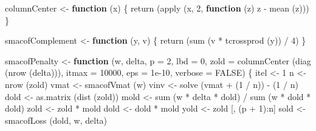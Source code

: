 \documentclass[
  12pt,
]{book}
\newenvironment{Shaded}{\begin{snugshade}}{\end{snugshade}}
\newcommand{\AttributeTok}[1]{\textcolor[rgb]{0.77,0.63,0.00}{#1}}
\newcommand{\ConstantTok}[1]{\textcolor[rgb]{0.00,0.00,0.00}{#1}}
\newcommand{\ControlFlowTok}[1]{\textcolor[rgb]{0.13,0.29,0.53}{\textbf{#1}}}
\newcommand{\DecValTok}[1]{\textcolor[rgb]{0.00,0.00,0.81}{#1}}
\newcommand{\FloatTok}[1]{\textcolor[rgb]{0.00,0.00,0.81}{#1}}
\newcommand{\FunctionTok}[1]{\textcolor[rgb]{0.00,0.00,0.00}{#1}}
\newcommand{\NormalTok}[1]{#1}
\newcommand{\OtherTok}[1]{\textcolor[rgb]{0.56,0.35,0.01}{#1}}
\newcommand{\SpecialCharTok}[1]{\textcolor[rgb]{0.00,0.00,0.00}{#1}}
\theoremstyle{definition}
\theoremstyle{definition}
\theoremstyle{definition}
\theoremstyle{definition}
\theoremstyle{remark}
\begin{document}
\begin{Shaded}
\begin{Highlighting}[]
\NormalTok{columnCenter }\OtherTok{\textless{}{-}} \ControlFlowTok{function}\NormalTok{ (x) \{}
  \FunctionTok{return}\NormalTok{ (}\FunctionTok{apply}\NormalTok{ (x, }\DecValTok{2}\NormalTok{, }\ControlFlowTok{function}\NormalTok{ (z)}
\NormalTok{    z }\SpecialCharTok{{-}} \FunctionTok{mean}\NormalTok{ (z)))}
\NormalTok{\}}

\NormalTok{smacofComplement }\OtherTok{\textless{}{-}} \ControlFlowTok{function}\NormalTok{ (y, v) \{}
  \FunctionTok{return}\NormalTok{ (}\FunctionTok{sum}\NormalTok{ (v }\SpecialCharTok{*} \FunctionTok{tcrossprod}\NormalTok{ (y)) }\SpecialCharTok{/} \DecValTok{4}\NormalTok{)}
\NormalTok{\}}

\NormalTok{smacofPenalty }\OtherTok{\textless{}{-}}
  \ControlFlowTok{function}\NormalTok{ (w,}
\NormalTok{            delta,}
            \AttributeTok{p =} \DecValTok{2}\NormalTok{,}
            \AttributeTok{lbd =} \DecValTok{0}\NormalTok{,}
            \AttributeTok{zold =} \FunctionTok{columnCenter}\NormalTok{ (}\FunctionTok{diag}\NormalTok{ (}\FunctionTok{nrow}\NormalTok{ (delta))),}
            \AttributeTok{itmax =} \DecValTok{10000}\NormalTok{,}
            \AttributeTok{eps =} \FloatTok{1e{-}10}\NormalTok{,}
            \AttributeTok{verbose =} \ConstantTok{FALSE}\NormalTok{) \{}
\NormalTok{    itel }\OtherTok{\textless{}{-}} \DecValTok{1}
\NormalTok{    n }\OtherTok{\textless{}{-}} \FunctionTok{nrow}\NormalTok{ (zold)}
\NormalTok{    vmat }\OtherTok{\textless{}{-}} \FunctionTok{smacofVmat}\NormalTok{ (w)}
\NormalTok{    vinv }\OtherTok{\textless{}{-}} \FunctionTok{solve}\NormalTok{ (vmat }\SpecialCharTok{+}\NormalTok{ (}\DecValTok{1} \SpecialCharTok{/}\NormalTok{ n)) }\SpecialCharTok{{-}}\NormalTok{ (}\DecValTok{1} \SpecialCharTok{/}\NormalTok{ n)}
\NormalTok{    dold }\OtherTok{\textless{}{-}} \FunctionTok{as.matrix}\NormalTok{ (}\FunctionTok{dist}\NormalTok{ (zold))}
\NormalTok{    mold }\OtherTok{\textless{}{-}} \FunctionTok{sum}\NormalTok{ (w }\SpecialCharTok{*}\NormalTok{ delta }\SpecialCharTok{*}\NormalTok{ dold) }\SpecialCharTok{/} \FunctionTok{sum}\NormalTok{ (w }\SpecialCharTok{*}\NormalTok{ dold }\SpecialCharTok{*}\NormalTok{ dold)}
\NormalTok{    zold }\OtherTok{\textless{}{-}}\NormalTok{ zold }\SpecialCharTok{*}\NormalTok{ mold}
\NormalTok{    dold }\OtherTok{\textless{}{-}}\NormalTok{ dold }\SpecialCharTok{*}\NormalTok{ mold}
\NormalTok{    yold }\OtherTok{\textless{}{-}}\NormalTok{ zold [, (p }\SpecialCharTok{+} \DecValTok{1}\NormalTok{)}\SpecialCharTok{:}\NormalTok{n]}
\NormalTok{    sold }\OtherTok{\textless{}{-}} \FunctionTok{smacofLoss}\NormalTok{ (dold, w, delta)}

\end{Highlighting}
\end{Shaded}
\end{document}
